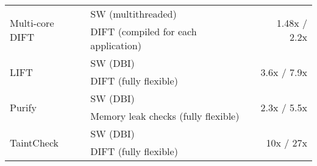 \begin{tabular}{|l|l|r|}
\multirow{2}{*}{Multi-core DIFT \cite{nagarajan-interact08}} & SW (multithreaded) & \multirow{2}{*}{1.48x / 2.2x} \\ 
& DIFT (compiled for each application) & \\ \hline
\multirow{2}{*}{LIFT \cite{lift-micro06}} & SW (DBI) & \multirow{2}{*}{3.6x / 7.9x} \\ 
& DIFT (fully flexible) & \\ \hline
\multirow{2}{*}{Purify \cite{purify-usenix92}} & SW (DBI) & \multirow{2}{*}{2.3x / 5.5x} \\ 
& Memory leak checks (fully flexible) & \\ \hline
\multirow{2}{*}{TaintCheck \cite{taintcheck-ndsss05}} & SW (DBI) & \multirow{2}{*}{10x / 27x} \\ 
& DIFT (fully flexible) & \\ \hline

\end{tabular}
